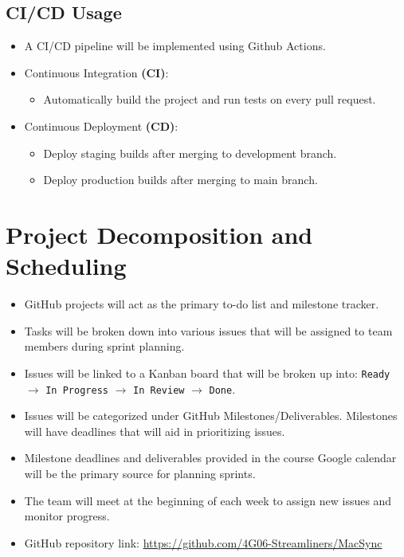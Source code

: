 \documentclass{article}
\begin{document}
\subsection{CI/CD Usage}
\begin{itemize}
    \item A CI/CD pipeline will be implemented using Github Actions.
    \item Continuous Integration \textbf{(CI)}:
    \begin{itemize}
        \item Automatically build the project and run tests on every pull request.
    \end{itemize}
    \item Continuous Deployment \textbf{(CD)}:
    \begin{itemize}
        \item Deploy staging builds after merging to development branch.
        \item Deploy production builds after merging to main branch.
    \end{itemize}
\end{itemize}

\section{Project Decomposition and Scheduling}

\begin{itemize}
  \item GitHub projects will act as the primary to-do list and milestone tracker.
  \item Tasks will be broken down into various issues that will be assigned to team members during sprint planning.
  \item Issues will be linked to a Kanban board that will be broken up into: \texttt{Ready} $\rightarrow$ \texttt{In Progress} $\rightarrow$ \texttt{In Review} $\rightarrow$ \texttt{Done}.
  \item Issues will be categorized under GitHub Milestones/Deliverables. Milestones will have deadlines that will aid in prioritizing issues.
  \item Milestone deadlines and deliverables provided in the course Google calendar will be the primary source for planning sprints. 
  \item The team will meet at the beginning of each week to assign new issues and monitor progress.
  \item GitHub repository link:
  \url{https://github.com/4G06-Streamliners/MacSync}
\end{itemize}
\end{document}
